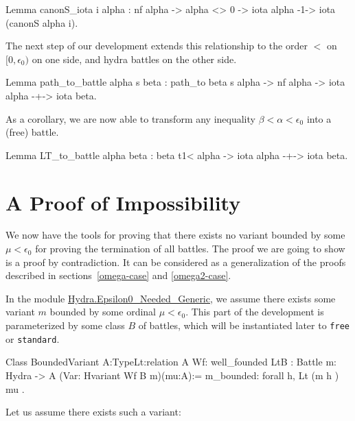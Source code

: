 \label{lemma:canonS-iota}

\begin{Coqsrc}
Lemma canonS_iota i alpha :
    nf alpha -> alpha <> 0 ->
    iota alpha -1-> iota (canonS alpha i).
\end{Coqsrc}
                

The next step of our development extends this relationship to
the order $<$ on $[0,\epsilon_0)$ on one side, and hydra battles on the other side.


\begin{Coqsrc}
Lemma path_to_battle alpha s beta :
  path_to  beta  s alpha -> nf alpha ->
  iota alpha -+-> iota beta.
\end{Coqsrc}

As a corollary, we are now able to transform any inequality $\beta<\alpha<\epsilon_0$ into a (free) battle.

\begin{Coqsrc}
Lemma LT_to_battle alpha beta :
    beta t1< alpha ->  iota alpha -+-> iota beta.
\end{Coqsrc}

\section{A  Proof of Impossibility}

We now have  the tools for proving that  there exists no variant bounded by some $\mu<\epsilon_0$ for proving the termination   of all battles. The proof we are going to show is a proof by contradiction. It  can
 be considered as a generalization of the
proofs described in  sections~\vref{omega-case} and \vref{omega2-case}.



In the module \href{../theories/html/hydras.Hydra.Epsilon0_Needed_Generic.html}{Hydra.Epsilon0\_Needed\_Generic}, we assume there exists some variant $m$ bounded by some ordinal $\mu<\epsilon_0$. This part of the development is parameterized by some class $B$ of battles, which will be instantiated later to \texttt{free} or \texttt{standard}.




\begin{Coqsrc}
Class BoundedVariant {A:Type}{Lt:relation A}
      {Wf: well_founded Lt}{B : Battle}
      {m: Hydra -> A} (Var: Hvariant  Wf  B m)(mu:A):=
  {
  m_bounded: forall h, Lt (m h ) mu
  }.
\end{Coqsrc}

Let us assume there exists such a variant:

